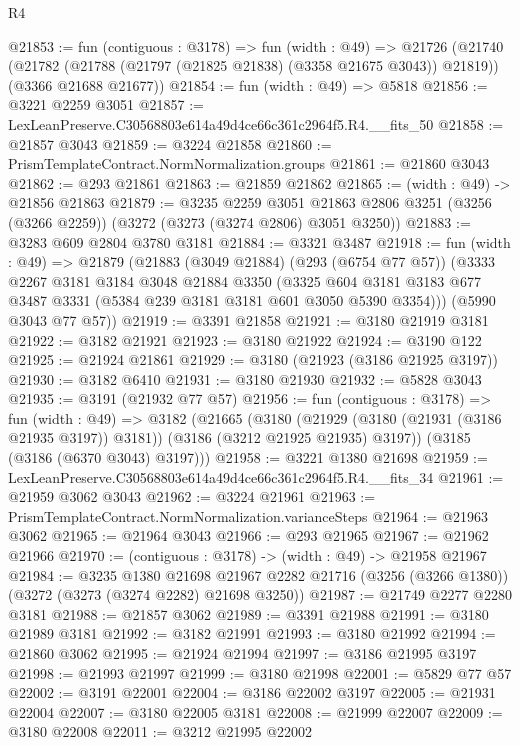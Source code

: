 \begin{lexlean}{R4}
\begin{coremodule}
@21853 := fun (contiguous : @3178) =>
  fun (width : @49) =>
  @21726
    (@21740
      (@21782 (@21788 (@21797 (@21825 @21838) (@3358 @21675 @3043)) @21819))
      (@3366 @21688 @21677))
@21854 := fun (width : @49) => @5818
@21856 := @3221 @2259 @3051
@21857 := LexLeanPreserve.C30568803e614a49d4ce66c361c2964f5.R4.__fits_50
@21858 := @21857 @3043
@21859 := @3224 @21858
@21860 := PrismTemplateContract.NormNormalization.groups
@21861 := @21860 @3043
@21862 := @293 @21861
@21863 := @21859 @21862
@21865 := (width : @49) -> @21856 @21863
@21879 := @3235
    @2259
    @3051
    @21863
    @2806
    @3251
    (@3256 (@3266 @2259))
    (@3272 (@3273 (@3274 @2806) @3051 @3250))
@21883 := @3283 @609 @2804 @3780 @3181
@21884 := @3321 @3487
@21918 := fun (width : @49) =>
  @21879
    (@21883
      (@3049 @21884)
      (@293 (@6754 @77 @57))
      (@3333
        @2267
        @3181
        @3184
        @3048
        @21884
        @3350
        (@3325 @604 @3181 @3183 @677 @3487 @3331 (@5384 @239 @3181 @3181 @601 @3050 @5390 @3354)))
      (@5990 @3043 @77 @57))
@21919 := @3391 @21858
@21921 := @3180 @21919 @3181
@21922 := @3182 @21921
@21923 := @3180 @21922
@21924 := @3190 @122
@21925 := @21924 @21861
@21929 := @3180 (@21923 (@3186 @21925 @3197))
@21930 := @3182 @6410
@21931 := @3180 @21930
@21932 := @5828 @3043
@21935 := @3191 (@21932 @77 @57)
@21956 := fun (contiguous : @3178) =>
  fun (width : @49) =>
  @3182
    (@21665
      (@3180
        (@21929 (@3180 (@21931 (@3186 @21935 @3197)) @3181))
        (@3186 (@3212 @21925 @21935) @3197))
      (@3185 (@3186 (@6370 @3043) @3197)))
@21958 := @3221 @1380 @21698
@21959 := LexLeanPreserve.C30568803e614a49d4ce66c361c2964f5.R4.__fits_34
@21961 := @21959 @3062 @3043
@21962 := @3224 @21961
@21963 := PrismTemplateContract.NormNormalization.varianceSteps
@21964 := @21963 @3062
@21965 := @21964 @3043
@21966 := @293 @21965
@21967 := @21962 @21966
@21970 := (contiguous : @3178) -> (width : @49) -> @21958 @21967
@21984 := @3235
    @1380
    @21698
    @21967
    @2282
    @21716
    (@3256 (@3266 @1380))
    (@3272 (@3273 (@3274 @2282) @21698 @3250))
@21987 := @21749 @2277 @2280 @3181
@21988 := @21857 @3062
@21989 := @3391 @21988
@21991 := @3180 @21989 @3181
@21992 := @3182 @21991
@21993 := @3180 @21992
@21994 := @21860 @3062
@21995 := @21924 @21994
@21997 := @3186 @21995 @3197
@21998 := @21993 @21997
@21999 := @3180 @21998
@22001 := @5829 @77 @57
@22002 := @3191 @22001
@22004 := @3186 @22002 @3197
@22005 := @21931 @22004
@22007 := @3180 @22005 @3181
@22008 := @21999 @22007
@22009 := @3180 @22008
@22011 := @3212 @21995 @22002

\end{coremodule}
\end{lexlean}
